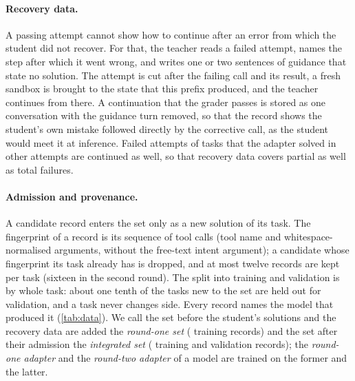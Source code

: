\paragraph{Recovery data.} A passing attempt cannot show how to continue after an error from which the student did not
recover. For that, the teacher reads a failed attempt, names the step after which it went wrong, and writes one or two
sentences of guidance that state no solution. The attempt is cut after the failing call and its result, a fresh sandbox
is brought to the state that this prefix produced, and the teacher continues from there. A continuation that the grader
passes is stored as one conversation with the guidance turn removed, so that the record shows the student's own mistake
followed directly by the corrective call, as the student would meet it at inference. Failed attempts of tasks that the
adapter solved in other attempts are continued as well, so that recovery data covers partial as well as total failures.

\paragraph{Admission and provenance.} A candidate record enters the set only as a new solution of its task. The
fingerprint of a record is its sequence of tool calls (tool name and whitespace-normalised arguments, without the
free-text intent argument); a candidate whose fingerprint its task already has is dropped, and at most twelve records
are kept per task (sixteen in the second round). The split into training and validation is by whole task: about one
tenth of the tasks new to the set are held out for validation, and a task never changes side. Every record names the
model that produced it (\cref{tab:data}). We call the set before the student's solutions and the recovery data are
added the \emph{round-one set} (\integrationTrainBefore{} training records) and the set after their admission the
\emph{integrated set} (\integrationTrainAfter{} training and \integrationValidationAfter{} validation records); the
\emph{round-one adapter} and the \emph{round-two adapter} of a model are trained on the former and the latter.

\begin{table}[t]
\centering\small

\caption{The integrated set by the model that made each record. A teacher continuation of an adapter's failed attempt
  counts as the teacher's; an adapter's row holds its own passing attempts. The teacher made \dataTeacherPct{}\% of the
  training records.}\label{tab:data}
\end{table}

